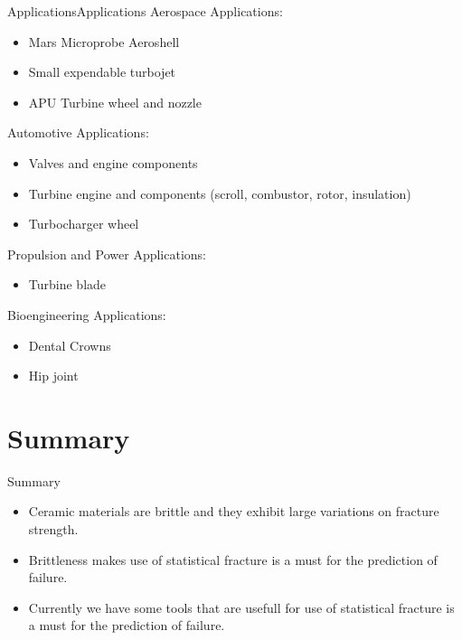 \documentclass{beamer}
\begin{document}
\begin{frame}{Applications}{Applications}
Aerospace Applications:
\begin{itemize}
    \item Mars Microprobe Aeroshell
    \item Small expendable turbojet
    \item APU Turbine wheel and nozzle
\end{itemize}
Automotive Applications:
\begin{itemize}
    \item Valves and engine components
    \item Turbine engine and components (scroll, combustor, rotor, insulation)
    \item Turbocharger wheel
\end{itemize}
Propulsion and Power Applications:
\begin{itemize}
    \item Turbine blade
\end{itemize}
Bioengineering Applications:
\begin{itemize}
    \item Dental Crowns
    \item Hip joint
\end{itemize}
\end{frame}




\section*{Summary}

\begin{frame}{Summary}

  \begin{itemize}
  \item
   Ceramic materials are brittle and they \alert{exhibit large variations} on fracture strength.
  \item
  	Brittleness makes \alert{use of statistical fracture is a must} for the prediction of failure.
   \item
  	Currently we have some tools that are usefull for \alert{use of statistical fracture is a must} for the prediction of failure.
  \end{itemize}
 
\end{frame}
\end{document}

